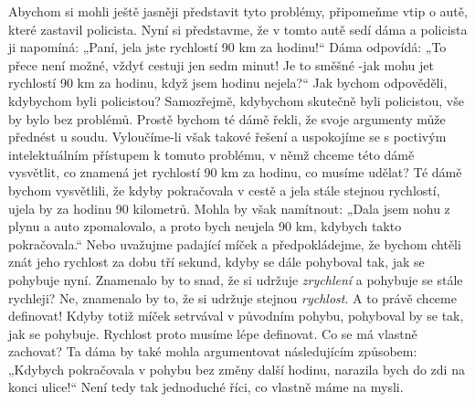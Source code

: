    Abychom si mohli ještě jasněji představit tyto problémy, připomeňme vtip o autě, které zastavil 
    policista. Nyní si představme, že v tomto autě sedí dáma a policista ji napomíná: „Paní, jela 
    jste rychlostí \num{90} km za hodinu!“ Dáma odpovídá: „To přece není možné, vždyť cestuji jen 
    sedm minut! Je to směšné -jak mohu jet rychlostí \num{90} km za hodinu, když jsem hodinu 
    nejela?“ Jak bychom odpověděli, kdybychom byli policistou? Samozřejmě, kdybychom skutečně byli 
    policistou, vše by bylo bez problémů. Prostě bychom té dámě řekli, že svoje argumenty může 
    přednést u soudu. Vyloučíme-li však takové řešení a uspokojíme se s poctivým intelektuálním 
    přístupem k tomuto problému, v němž chceme této dámě vysvětlit, co znamená jet rychlostí 
    \num{90} km za hodinu, co musíme udělat? Té dámě bychom vysvětlili, že kdyby pokračovala v 
    cestě a jela stále stejnou rychlostí, ujela by za hodinu \num{90} kilometrů. Mohla by však 
    namítnout: „Dala jsem nohu z plynu a auto zpomalovalo, a proto bych neujela \num{90} km, 
    kdybych takto pokračovala.“ Nebo uvažujme padající míček a předpokládejme, že bychom chtěli 
    znát jeho rychlost za dobu tří sekund, kdyby se dále pohyboval tak, jak se pohybuje nyní. 
    Znamenalo by to snad, že si udržuje \emph{zrychlení} a pohybuje se stále rychleji? Ne, 
    znamenalo by to, že si udržuje stejnou \emph{rychlost}. A to právě chceme definovat! Kdyby 
    totiž míček setrvával v původním pohybu, pohyboval by se tak, jak se pohybuje. Rychlost proto 
    musíme lépe definovat. Co se má vlastně zachovat? Ta dáma by také mohla argumentovat 
    následujícím způsobem: „Kdybych pokračovala v pohybu bez změny další hodinu, narazila bych do 
    zdi na konci ulice!“ Není tedy tak jednoduché říci, co vlastně máme na mysli.
    
